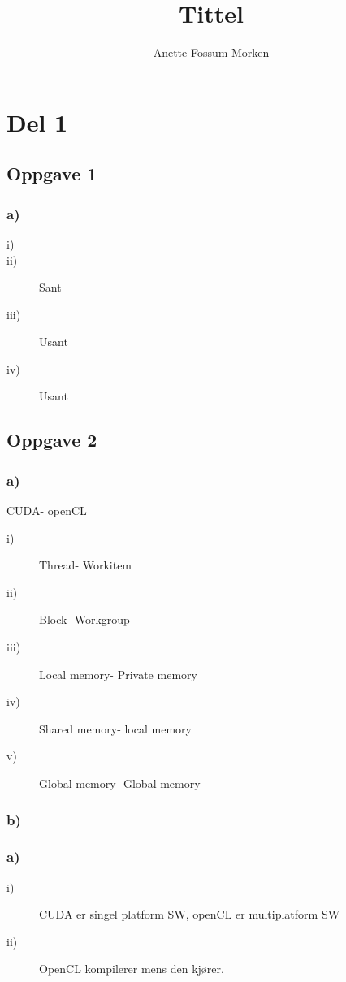 \documentclass[12pt, a4paper]{article} %
\title{Tittel}
\author[1]{Anette Fossum Morken}
\date{}
\begin{document}
\maketitle
\section*{Del 1}
\subsection*{Oppgave 1}
\subsubsection*{a)}
\begin{description}
\item[i)]
\item[ii)] Sant
\item[iii)] Usant
\item[iv)] Usant
\end{description}

\subsection*{Oppgave 2}
\subsubsection*{a)}
CUDA- openCL
\begin{description}
\item[i)] Thread- Workitem
\item[ii)] Block- Workgroup 
\item[iii)] Local memory- Private memory
\item[iv)] Shared memory- local memory
\item[v)] Global memory- Global memory
\end{description}

\subsubsection*{b)}
\subsubsection*{a)}
\begin{description}
\item[i)] CUDA er singel platform SW, openCL er multiplatform SW
\item[ii)] OpenCL kompilerer mens den kjører.
\end{description}
\end{document}
